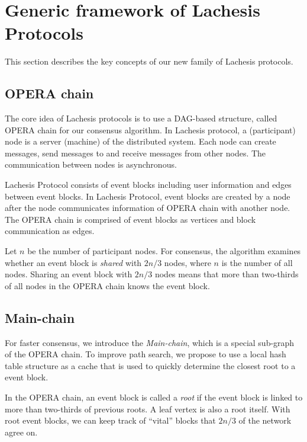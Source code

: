 \documentclass[preprint,12pt]{elsarticle}
\begin{document}
\section{Generic framework of Lachesis Protocols}\label{se:protocol}

This section describes the key concepts of our new family of Lachesis protocols.

\subsection{OPERA chain}

The core idea of Lachesis protocols is to use a DAG-based structure, called OPERA chain for our consensus algorithm. 
In Lachesis protocol, a (participant) node is a server (machine) of the distributed system.
Each node can create messages, send messages to and receive messages from other nodes. The communication between nodes is asynchronous. 





Lachesis Protocol consists of event blocks including user information and edges between event blocks. In Lachesis Protocol, event blocks are created by a node after the node communicates information of OPERA chain with another node. The OPERA chain is comprised of event blocks as vertices and block communication as edges.

Let $n$ be the number of participant nodes.
For consensus, the algorithm examines whether an event block is \emph{shared} with $2n/3$ nodes, where $n$ is the number of all nodes. Sharing an event block with $2n/3$ nodes means that more than two-thirds of all nodes in the OPERA chain knows the event block. 

\subsection{Main-chain}

For faster consensus, we introduce the \emph{Main-chain}, which is a special sub-graph of the OPERA chain. To improve path search, we propose to use a local hash table structure as a cache that is used to quickly determine the closest root to a event block.

In the OPERA chain, an event block is called a \emph{root} if the event block is linked to more than two-thirds of previous roots. A leaf vertex is also a root itself. With root event blocks, we can keep track of ``vital'' blocks that $2n/3$ of the network agree on.  
\end{document}
